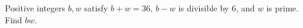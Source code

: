 Positive integers $ b,w $ satisfy $ b+w=36 $, $ b-w $ is divisible by 6, and $ w $ is prime. Find $ bw $.
